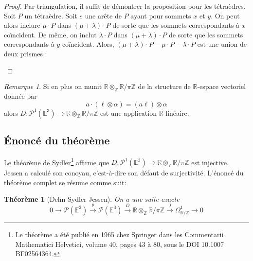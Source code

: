 \documentclass{article}
\newcommand{\Z}{\mathbb{Z}}
\newcommand{\R}{\mathbb{R}}
\newcommand{\E}{\mathbb{E}}
\renewcommand{\P}{\mathcal{P}}
\theoremstyle{plain}
\newtheorem{theorem}{Théorème}
\theoremstyle{definition}
\theoremstyle{remark}
\newtheorem*{remark}{Remarque}
\begin{document}
\begin{proof}
    Par triangulation, il suffit de démontrer la proposition pour les tétraèdres. Soit $P$ un tétraèdre. Soit $e$ une arête de $P$ ayant pour sommets $x$ et $y$. On peut alors inclure $\mu \cdot P$ dans $(\mu+\lambda) \cdot P$ de sorte que les sommets correspondants à $x$ coïncident. De même, on inclut $\lambda \cdot P$ dans $(\mu+\lambda) \cdot P$ de sorte que les sommets correspondants à $y$ coïncident. Alors, $(\mu + \lambda)\cdot P - \mu \cdot P - \lambda \cdot P$ est une union de deux prismes :
    \begin{center}
    \end{center}
\end{proof}

\begin{remark}
    Si en plus on munit $\R \otimes_\Z \R/\pi\Z$ de la structure de $\R$-espace vectoriel donnée par
    \[a \cdot (\ell \otimes \alpha) = (a\ell) \otimes \alpha\]
    alors $D : \P^1(\E^3) \to \R \otimes_\Z \R/\pi\Z$ est une application $\R$-linéaire.
\end{remark}

\subsection{Énoncé du théorème}
Le théorème de Sydler\footnote{Le théorème a été publié en 1965 chez Springer dans les Commentarii Mathematici Helvetici, volume 40, pages 43 à 80, sous le DOI 10.1007 BF02564364.} affirme que $D : \P^1(\E^3) \to \R \otimes_\Z \R/\pi\Z$ est injective. Jessen a calculé son conoyau, c'est-à-dire son défaut de surjectivité. L'énoncé du théorème complet se résume comme suit:
\begin{theorem}[Dehn-Sydler-Jessen]
    On a une suite exacte
    \[0 \to \P(\E^2) \xrightarrow{p} \P(\E^3) \xrightarrow{D} \R \otimes_\Z \R/\pi\Z \xrightarrow{J} \Omega_{\R/\Z}^1 \to 0\]
\end{theorem}
\end{document}

